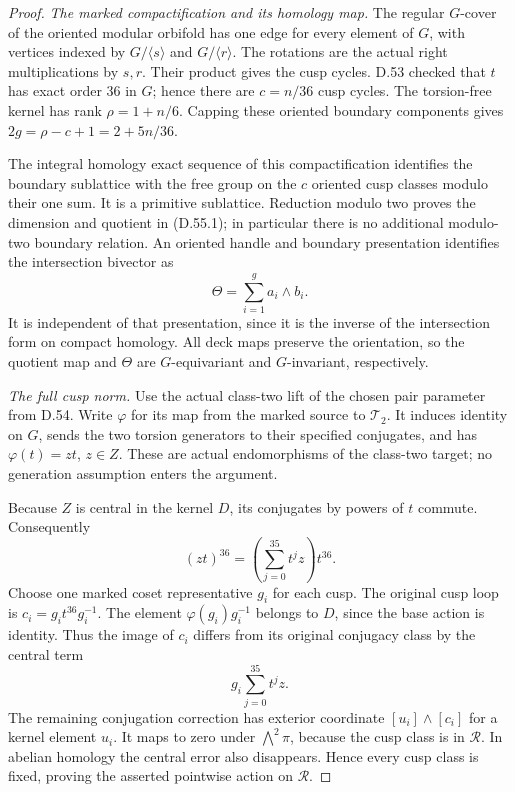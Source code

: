 \begin{proof}
\emph{The marked compactification and its homology map.}
The regular \(G\)-cover of the
oriented modular orbifold has
one edge for every element of \(G\),
with vertices indexed by
\(G/\langle s\rangle\) and
\(G/\langle r\rangle\).
The rotations are the actual
right multiplications by \(s,r\).
Their product gives the cusp cycles.
D.53 checked that \(t\) has exact
order \(36\) in \(G\); hence there
are \(c=n/36\) cusp cycles.
The torsion-free kernel has rank
\(\rho=1+n/6\). Capping these oriented
boundary components gives
\(2g=\rho-c+1=2+5n/36\).

The integral homology exact sequence
of this compactification identifies
the boundary sublattice with the
free group on the \(c\) oriented
cusp classes modulo their one sum.
It is a primitive sublattice.
Reduction modulo two proves the
dimension and quotient in (D.55.1);
in particular there is no additional
modulo-two boundary relation.
An oriented handle and boundary
presentation identifies the
intersection bivector as
\[
                  \Theta=\sum_{i=1}^{g}a_i\wedge b_i .
 \tag{D.55.9}
\]
It is independent of that presentation,
since it is the inverse of the
intersection form on compact homology.
All deck maps preserve the orientation,
so the quotient map and \(\Theta\)
are \(G\)-equivariant and \(G\)-invariant,
respectively.

\emph{The full cusp norm.}
Use the actual class-two lift of
the chosen pair parameter from D.54.
Write \(\varphi\) for its map from
the marked source to \(\mathcal T_2\).
It induces identity on \(G\), sends
the two torsion generators to their
specified conjugates, and has
\(\varphi(t)=zt\), \(z\in Z\).
These are actual endomorphisms of
the class-two target; no generation
assumption enters the argument.

Because \(Z\) is central in the
kernel \(D\), its conjugates by
powers of \(t\) commute. Consequently
\[
            (zt)^{36}
             =\left(\sum_{j=0}^{35}t^jz\right)t^{36}.
 \tag{D.55.10}
\]
Choose one marked coset representative
\(g_i\) for each cusp. The original
cusp loop is \(c_i=g_it^{36}g_i^{-1}\).
The element \(\varphi(g_i)g_i^{-1}\)
belongs to \(D\), since the base action
is identity. Thus the image of \(c_i\)
differs from its original conjugacy
class by the central term
\[
                         g_i\sum_{j=0}^{35}t^jz .
 \tag{D.55.11}
\]
The remaining conjugation correction
has exterior coordinate
\([u_i]\wedge[c_i]\) for a kernel
element \(u_i\). It maps to zero
under \(\bigwedge^2\pi\), because
the cusp class is in \(\mathcal R\).
In abelian homology the central error
also disappears. Hence every cusp
class is fixed, proving the asserted
pointwise action on \(\mathcal R\).


\end{proof}
